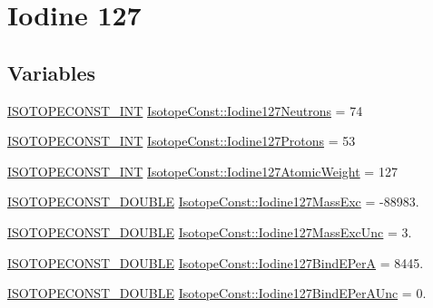 \hypertarget{group___isotope_const-_iodine-_i127}{}\section{Iodine 127}
\label{group___isotope_const-_iodine-_i127}
\subsection*{Variables}
\begin{DoxyCompactItemize}
\item 
\mbox{\hyperlink{group___isotope_const-_macros_ga5f18360b3e99483a35c32d789e62621c}{I\+S\+O\+T\+O\+P\+E\+C\+O\+N\+S\+T\+\_\+\+I\+NT}} \mbox{\hyperlink{group___isotope_const-_iodine-_i127_gaa4f63469601d5091a9cc49f2f582dde7}{Isotope\+Const\+::\+Iodine127\+Neutrons}} = 74
\item 
\mbox{\hyperlink{group___isotope_const-_macros_ga5f18360b3e99483a35c32d789e62621c}{I\+S\+O\+T\+O\+P\+E\+C\+O\+N\+S\+T\+\_\+\+I\+NT}} \mbox{\hyperlink{group___isotope_const-_iodine-_i127_ga355872e125a067c0936ee11d31ea97fd}{Isotope\+Const\+::\+Iodine127\+Protons}} = 53
\item 
\mbox{\hyperlink{group___isotope_const-_macros_ga5f18360b3e99483a35c32d789e62621c}{I\+S\+O\+T\+O\+P\+E\+C\+O\+N\+S\+T\+\_\+\+I\+NT}} \mbox{\hyperlink{group___isotope_const-_iodine-_i127_gabdfcc2697722b58fee2453478d475766}{Isotope\+Const\+::\+Iodine127\+Atomic\+Weight}} = 127
\item 
\mbox{\hyperlink{group___isotope_const-_macros_ga8f45a7272ce02c0b4c65c44636ed719a}{I\+S\+O\+T\+O\+P\+E\+C\+O\+N\+S\+T\+\_\+\+D\+O\+U\+B\+LE}} \mbox{\hyperlink{group___isotope_const-_iodine-_i127_gab194dbfe3b8e66d178bc36b5515e994f}{Isotope\+Const\+::\+Iodine127\+Mass\+Exc}} = -\/88983.
\item 
\mbox{\hyperlink{group___isotope_const-_macros_ga8f45a7272ce02c0b4c65c44636ed719a}{I\+S\+O\+T\+O\+P\+E\+C\+O\+N\+S\+T\+\_\+\+D\+O\+U\+B\+LE}} \mbox{\hyperlink{group___isotope_const-_iodine-_i127_gaf63a8a806159911635ce27d3ef560b84}{Isotope\+Const\+::\+Iodine127\+Mass\+Exc\+Unc}} = 3.
\item 
\mbox{\hyperlink{group___isotope_const-_macros_ga8f45a7272ce02c0b4c65c44636ed719a}{I\+S\+O\+T\+O\+P\+E\+C\+O\+N\+S\+T\+\_\+\+D\+O\+U\+B\+LE}} \mbox{\hyperlink{group___isotope_const-_iodine-_i127_ga29e398580bee890918290196e88b6ef6}{Isotope\+Const\+::\+Iodine127\+Bind\+E\+PerA}} = 8445.
\item 
\mbox{\hyperlink{group___isotope_const-_macros_ga8f45a7272ce02c0b4c65c44636ed719a}{I\+S\+O\+T\+O\+P\+E\+C\+O\+N\+S\+T\+\_\+\+D\+O\+U\+B\+LE}} \mbox{\hyperlink{group___isotope_const-_iodine-_i127_ga7d8219c143cc0606f844653488b6ebd1}{Isotope\+Const\+::\+Iodine127\+Bind\+E\+Per\+A\+Unc}} = 0.

\end{DoxyCompactItemize}
